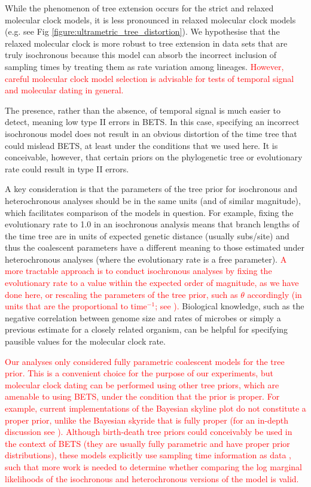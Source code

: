 \documentclass[10pt,letterpaper]{article}
\begin{document}
While the phenomenon of tree extension occurs for the strict and relaxed molecular clock models, it is less pronounced in relaxed molecular clock models (e.g. see Fig \ref{figure:ultrametric_tree_distortion}). We hypothesise that the relaxed molecular clock is more robust to tree extension in data sets that are truly isochronous because this model can absorb the incorrect inclusion of sampling times by treating them as rate variation among lineages. \textcolor{red}{However, careful molecular clock model selection is advisable for tests of temporal signal and molecular dating in general.}

The presence, rather than the absence, of temporal signal is much easier to detect, meaning low type II errors in BETS. In this case, specifying an incorrect isochronous model does not result in an obvious distortion of the time tree that could mislead BETS, at least under the conditions that we used here. It is conceivable, however, that certain priors on the phylogenetic tree or evolutionary rate could result in type II errors. 

A key consideration is that the parameters of the tree prior for isochronous and heterochronous analyses should be in the same units (and of similar magnitude), which facilitates comparison of the models in question. For example, fixing the evolutionary rate to 1.0 in an isochronous analysis means that branch lengths of the time tree are in units of expected genetic distance (usually subs/site) and thus the coalescent parameters have a different meaning to those estimated under heterochronous analyses (where the evolutionary rate is a free parameter). \textcolor{red}{A more tractable approach is to conduct isochronous analyses by fixing the evolutionary rate to a value within the expected order of magnitude, as we have done here, or rescaling the parameters of the tree prior, such as $\theta$ accordingly (in units that are the proportional to time$^{-1}$; see \cite{boskova2014inference}).} Biological knowledge, such as the negative correlation between genome size and rates of microbes \cite{sanjuan2012molecular, duchene2016genome} or simply a previous estimate for a closely related organism, can be helpful for specifying pausible values for the molecular clock rate.

\textcolor{red}{Our analyses only considered fully parametric coalescent models for the tree prior. This is a convenient choice for the purpose of our experiments, but molecular clock dating can be performed using other tree priors, which are amenable to using BETS, under the condition that the prior is proper. For example, current implementations of the Bayesian skyline plot do not constitute a proper prior, unlike the Bayesian skyride that is fully proper (for an in-depth discussion see \cite{baele2014bayesian}). Although birth-death tree priors could conceivably be used in the context of BETS (they are usually fully parametric and have proper prior distributions), these models explicitly use sampling time information as data \cite{boskova2018influence}, such that more work is needed to determine whether comparing the log marginal likelihoods of the isochronous and heterochronous versions of the model is valid.}
\end{document}
